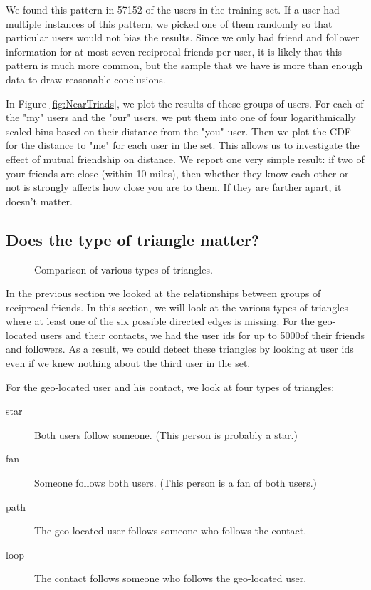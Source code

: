 \documentclass{sig-alternate}
\begin{document}
We found this pattern in 57152 of the users in the training set. If a user had multiple instances of this pattern, we picked one of them randomly so that particular users would not bias the results.
Since we only had friend and follower information for at most seven reciprocal friends per user, it is likely that this pattern is much more common, but the sample that we have is more than enough data to draw reasonable conclusions.

In Figure \ref{fig:NearTriads}, we plot the results of these groups of users.
For each of the "my" users and the "our" users, we put them into one of four logarithmically scaled bins based on their distance from the "you" user. Then we plot the CDF for the distance to "me" for each user in the set. This allows us to investigate the effect of mutual friendship on distance.
We report one very simple result: if two of your friends are close (within 10 miles), then whether they know each other or not is strongly affects how close you are to them. If they are farther apart, it doesn't matter.

\subsection{Does the type of triangle matter?}
\begin{figure*}
\centering
{}
\caption{
Comparison of various types of triangles.
}
\label{fig:TriadTypes}
\end{figure*}
In the previous section we looked at the relationships between groups of reciprocal friends.
In this section, we will look at the various types of triangles where at least one of the six possible directed edges is missing.
For the geo-located users and their contacts, we had the user ids for up to 5000of their friends and followers. As a result, we could detect these triangles by looking at user ids even if we knew nothing about the third user in the set.

For the geo-located user and his contact, we look at four types of triangles:
\begin{description}
\item[star] Both users follow someone. (This person is probably a star.)
\item[fan] Someone follows both users. (This person is a fan of both users.)
\item[path] The geo-located user follows someone who follows the contact.
\item[loop] The contact follows someone who follows the geo-located user.
\end{description}
\end{document}

